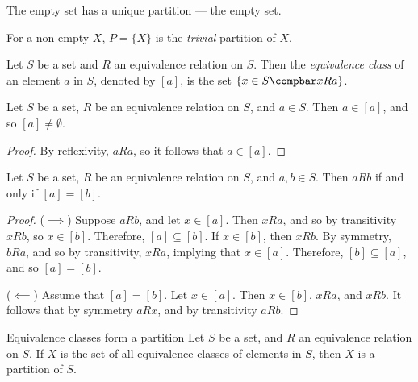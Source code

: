 \documentclass[12pt]{article}
\begin{document}
\begin{exmp}
    The empty set has a unique partition --- the empty set.
\end{exmp}

\begin{defn}
    For a non-empty $X$, $P = \{X\}$ is the \emph{trivial} partition of $X$.
\end{defn}

\begin{defn}\label{equivalence-class}
    Let $S$ be a set and $R$ an equivalence relation on $S$. Then the \emph{equivalence class} of an element $a$ in $S$, denoted by $\left[a\right]$, is the set $\left\{x \in S \compbar x R a\right\}$.
\end{defn}

\begin{lemma}\label{equiv-class-non-empty}
    Let $S$ be a set, $R$ be an equivalence relation on $S$, and $a \in S$. Then $a \in [a]$, and so $[a] \neq \emptyset$.
\end{lemma}

\begin{proof}
    By reflexivity, $a R a$, so it follows that $a \in [a]$.
\end{proof}

\begin{lemma}\label{equiv-class-equal}
    Let $S$ be a set, $R$ be an equivalence relation on $S$, and $a, b \in S$. Then $a R b$ if and only if $[a] = [b]$.
\end{lemma}

\begin{proof}\proofbreak
    ($\implies$) Suppose $a R b$, and let $x \in [a]$. Then $x R a$, and so by transitivity $x R b$, so $x \in [b]$. Therefore, $[a] \subseteq [b]$. If $x \in [b]$, then $x R b$. By symmetry, $b R a$, and so by transitivity, $x R a$, implying that $x \in [a]$. Therefore, $[b] \subseteq [a]$, and so $[a] = [b]$.

    ($\impliedby$) Assume that $[a] = [b]$. Let $x \in [a]$. Then $x \in [b]$, $x R a$, and $x R b$. It follows that by symmetry $a R x$, and by transitivity $a R b$.
\end{proof}

\begin{thm}{Equivalence classes form a partition}\proofbreak
    Let $S$ be a set, and $R$ an equivalence relation on $S$. If $X$ is the set of all equivalence classes of elements in $S$, then $X$ is a partition of $S$.
\end{thm}
\end{document}
